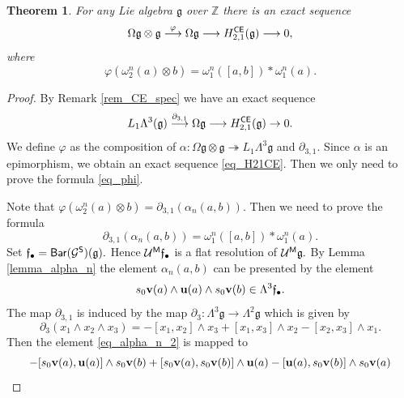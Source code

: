 \documentclass{amsart}
\numberwithin{equation}{section}
\newtheorem{theorem}{Theorem}[section]
\theoremstyle{definition}
\def\epi{\twoheadrightarrow}
\def\GG{\mathcal{G}}
\def\UU{\mathcal{U}}
\def\gg{\mathfrak{g}}
\def\ff{\mathfrak{f}}
\def\ZZ{\mathbb{Z}}
\begin{document}
\begin{theorem}\label{th_H21}
For any Lie algebra $\gg$ over $\ZZ$ there is an  exact sequence
\begin{equation}\label{eq_H21CE}
\Omega \gg \otimes \gg \overset{\varphi}\longrightarrow \Omega \gg \longrightarrow H_{2,1}^{\sf CE}(\gg) \longrightarrow 0,    
\end{equation}
where 
\begin{equation}\label{eq_phi}
\varphi(\omega_2^n(a)\otimes b )= \omega_1^n([a,b])*\omega^n_1(a).    
\end{equation}
\end{theorem}
\begin{proof} By Remark \ref{rem_CE_spec} we have an exact sequence $$L_1\Lambda^3(\gg) \overset{\partial_{3,1}}\longrightarrow \Omega \gg \longrightarrow H_{2,1}^{\sf CE}(\gg)\to 0.$$ We define $\varphi$ as the composition of $\alpha:\Omega \gg\otimes \gg\epi L_1\Lambda^3 \gg$ and $\partial_{3,1}.$ Since $\alpha$ is an epimorphism, we obtain an exact sequence \eqref{eq_H21CE}. Then we only need to prove the formula \eqref{eq_phi}. 

Note that $\varphi(\omega^n_2(a)\otimes b)=\partial_{3,1}(\alpha_n(a,b)).$ Then we need to prove the formula 
$$\partial_{3,1}(\alpha_n(a,b)) = \omega_1^n([a,b])*\omega^n_1(a).$$ 
Set $\ff_\bullet={\sf Bar}(\GG^{\sf S})(\gg).$ Hence $\UU^{\sf M}\ff_\bullet $ is a flat resolution of $\UU^{\sf M}\gg.$ By Lemma \ref{lemma_alpha_n} the element $\alpha_n(a,b)$ can be presented by the element 
\begin{equation}\label{eq_alpha_n_2}
s_0{\bf v}(a) \wedge {\bf u}(a) \wedge s_0{\bf v}(b) \in \Lambda^3 \ff_\bullet.   
\end{equation}
The map $\partial_{3,1}$ is induced by the map $\partial_3:\Lambda^3 \gg \to \Lambda^2 \gg$ which is given by 
$$\partial_3( x_1\wedge x_2 \wedge x_3)= - [x_1,x_2] \wedge x_3 +[x_1,x_3] \wedge x_2 - [x_2,x_3] \wedge x_1.$$ 
Then the element 
\eqref{eq_alpha_n_2} 
is mapped to 
\begin{equation}\label{eq_sum_comp}
    - [s_0{\bf v}(a),{\bf u}(a) ] \wedge s_0 {\bf v}(b) +[s_0{\bf v}(a),s_0{\bf v}(b)] \wedge {\bf u}(a) - [{\bf u}(a),s_0{\bf v}(b)] \wedge s_0{\bf v}(a)
\end{equation}



\end{proof}
\end{document}
